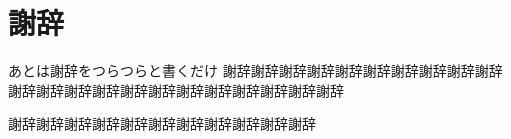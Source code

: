 \chapter*{謝辞}

あとは謝辞をつらつらと書くだけ
謝辞謝辞謝辞謝辞謝辞謝辞謝辞謝辞謝辞謝辞謝辞謝辞謝辞謝辞謝辞謝辞謝辞謝辞謝辞謝辞謝辞謝辞


謝辞謝辞謝辞謝辞謝辞謝辞謝辞謝辞謝辞謝辞謝辞

